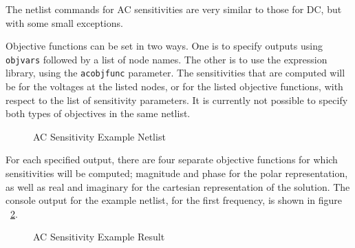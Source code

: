 The netlist commands for AC sensitivities are very similar to those
for DC, but with some small exceptions.   

Objective functions can be set in two ways.  One is to 
specify outputs using \texttt{objvars}
followed by a list of node names.    The other is to use the expression library, using the \texttt{acobjfunc} parameter.
The sensitivities that are computed
will be for the voltages at the listed nodes, or for the listed objective functions, with respect to the list
of sensitivity parameters.  It is currently not  possible to specify both types of objectives in the same netlist.
\begin{figure}[htbp]
  \begin{centering}
\caption[AC Sensitivity Example Netlist]
{AC Sensitivity Example Netlist \label{AC_Sensitivity_Netlist} }
\end{centering}
\end{figure}
For each specified output, there are four separate objective functions
for which sensitivities will be computed; magnitude and phase for the
polar representation, as well as real and imaginary for the cartesian
representation of the solution.  The console output for the example
netlist, for the first frequency, is shown in figure
~\ref{AC_Sensitivity_Result}.
\begin{figure}[htbp]
  \begin{centering}
\caption[AC Sensitivity Example Result]
{AC Sensitivity Example Result\label{AC_Sensitivity_Result} }
\end{centering}
\end{figure}

